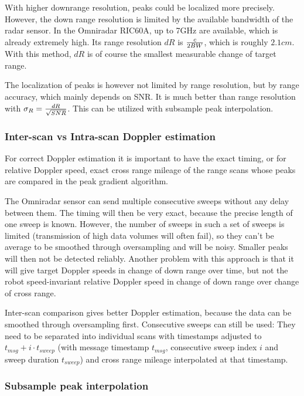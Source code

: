 With higher downrange resolution, peaks could be localized more
precisely. However, the down range resolution is limited by the
available bandwidth of the radar sensor. In the Omniradar RIC60A, up to
7GHz are available, which is already extremely high. Its range
resolution \(dR\) is \(c \over{2 BW}\), which is roughly \(2.1cm\). With
this method, \(dR\) is of course the smallest measurable change of
target range.

The localization of peaks is however not limited by range resolution,
but by range accuracy, which mainly depends on SNR. It is much better
than range resolution with \(\sigma_R = {dR \over{\sqrt{SNR}}}\). This
can be utilized with subsample peak interpolation.

\subsubsection{Inter-scan vs Intra-scan Doppler
estimation}\label{inter-scan-vs-intra-scan-doppler-estimation}

For correct Doppler estimation it is important to have the exact timing,
or for relative Doppler speed, exact cross range mileage of the range
scans whose peaks are compared in the peak gradient algorithm.

The Omniradar sensor can send multiple consecutive sweeps without any
delay between them. The timing will then be very exact, because the
precise length of one sweep is known. However, the number of sweeps in
such a set of sweeps is limited (transmission of high data volumes will
often fail), so they can't be average to be smoothed through
oversampling and will be noisy. Smaller peaks will then not be detected
reliably. Another problem with this approach is that it will give target
Doppler speeds in change of down range over time, but not the robot
speed-invariant relative Doppler speed in change of down range over
change of cross range.

Inter-scan comparison gives better Doppler estimation, because the data
can be smoothed through oversampling first. Consecutive sweeps can still
be used: They need to be separated into individual scans with timestamps
adjusted to \(t_{msg} + i\cdot t_{sweep}\) (with message timestamp
\(t_{msg}\), consecutive sweep index \(i\) and sweep duration
\(t_{sweep}\)) and cross range mileage interpolated at that timestamp.

\subsubsection{Subsample peak
interpolation}\label{subsample-peak-interpolation}


